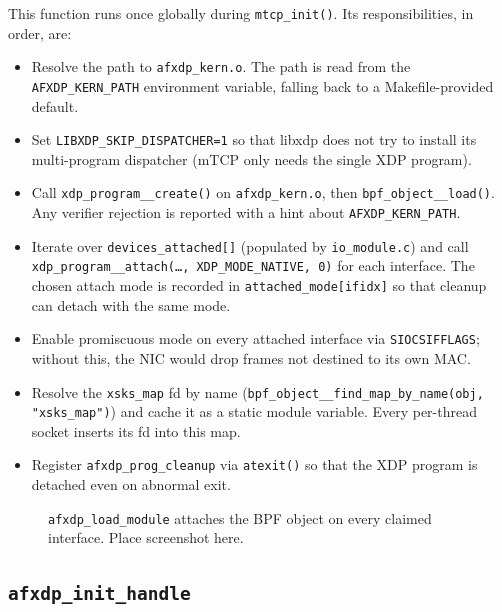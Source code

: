 \documentclass[10pt, letterpaper, twocolumn]{article}
\begin{document}
This function runs once globally during \texttt{mtcp\_init()}. Its responsibilities, in order, are:
\begin{itemize}
    \item Resolve the path to \texttt{afxdp\_kern.o}. The path is read from the \texttt{AFXDP\_KERN\_PATH} environment variable, falling back to a Makefile-provided default.
    \item Set \texttt{LIBXDP\_SKIP\_DISPATCHER=1} so that libxdp does not try to install its multi-program dispatcher (mTCP only needs the single XDP program).
    \item Call \texttt{xdp\_program\_\_create()} on \texttt{afxdp\_kern.o}, then \texttt{bpf\_object\_\_load()}. Any verifier rejection is reported with a hint about \texttt{AFXDP\_KERN\_PATH}.
    \item Iterate over \texttt{devices\_attached[]} (populated by \texttt{io\_module.c}) and call \texttt{xdp\_program\_\_attach(\dots, XDP\_MODE\_NATIVE, 0)} for each interface. The chosen attach mode is recorded in \texttt{attached\_mode[ifidx]} so that cleanup can detach with the same mode.
    \item Enable promiscuous mode on every attached interface via \texttt{SIOCSIFFLAGS}; without this, the NIC would drop frames not destined to its own MAC.
    \item Resolve the \texttt{xsks\_map} fd by name (\texttt{bpf\_object\_\_find\_map\_by\_name(obj, "xsks\_map")}) and cache it as a static module variable. Every per-thread socket inserts its fd into this map.
    \item Register \texttt{afxdp\_prog\_cleanup} via \texttt{atexit()} so that the XDP program is detached even on abnormal exit.
\end{itemize}

\begin{figure}[htbp]
    \centering
    \caption{\texttt{afxdp\_load\_module} attaches the BPF object on every claimed interface. Place screenshot here.}
    \label{fig:load_module}
\end{figure}
\FloatBarrier

\subsection{\texttt{afxdp\_init\_handle}}
\end{document}
